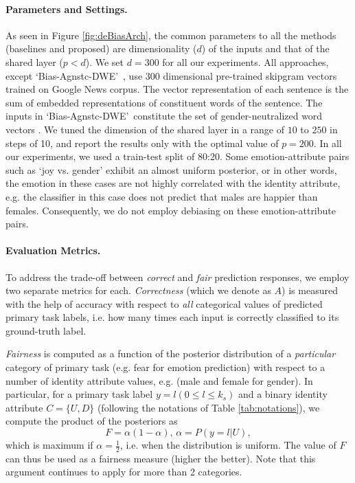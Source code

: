 \documentclass[letterpaper]{article}
\newcommand{\STWRDW}{`Bias-Agnstc-DWE'~}
\begin{document}
\paragraph{Parameters and Settings.}
As seen in Figure \ref{fig:deBiasArch}, the common parameters to all the methods (baselines and proposed) are dimensionality ($d$) of the inputs and that of the shared layer ($p < d$).
We set $d=300$ for all our experiments. All approaches, except \STWRDW, use $300$ dimensional pre-trained skipgram vectors trained on Google News corpus. The vector representation of each sentence is the
sum of embedded representations of constituent words of the sentence.
The inputs in \STWRDW constitute the set of gender-neutralized word vectors \citep{Bolukbasi:2016}.
We tuned the dimension of the shared layer in a range of $10$ to $250$ in steps of 10, and report the results only with the optimal value of $p=200$.
In all our experiments, we used a train-test split of 80:20. Some emotion-attribute pairs such as `joy vs. gender' exhibit an almost uniform posterior, or in other words, the emotion in these cases are not highly correlated with the identity attribute, e.g. the classifier in this case
does not predict that males are happier than females.
Consequently, we do not employ debiasing on these emotion-attribute pairs.

\paragraph{Evaluation Metrics.}
To address the trade-off between \emph{correct} and \emph{fair} prediction responses, we employ two separate metrics for each. \emph{Correctness} (which we denote as $A$) is measured with the help of accuracy with respect to \emph{all} categorical values of predicted primary task labels, i.e. how many times each input is correctly classified to its ground-truth label.


\emph{Fairness} is computed as a function of the posterior distribution of a \emph{particular} category of primary task (e.g. fear for emotion prediction) with respect to a number of identity attribute values, e.g. (male and female for gender). In particular, for a primary task label $y=l (0\leq l \leq k_s)$ and a binary identity attribute $C=\{U,D\}$ (following the notations of Table \ref{tab:notations}), we compute the product of the posteriors as
\begin{equation}
F=\alpha(1-\alpha),\, \alpha=P(y=l|U),
\end{equation}
which is maximum if $\alpha=\frac{1}{2}$, i.e. when the distribution is uniform. The value of $F$ can thus be used as a fairness measure (higher the better). Note that this argument continues to apply for more than 2 categories.
\end{document}
